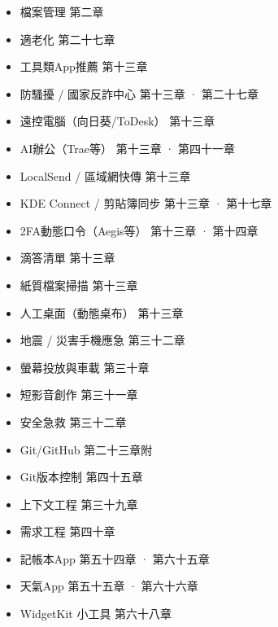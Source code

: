 
\begin{itemize}
  \item 檔案管理 第二章
  \item 適老化 第二十七章
  \item 工具類App推薦 第十三章
  \item 防騷擾 / 國家反詐中心 第十三章 · 第二十七章
  \item 遠控電腦（向日葵/ToDesk） 第十三章
  \item AI辦公（Trae等） 第十三章 · 第四十一章
  \item LocalSend / 區域網快傳 第十三章
  \item KDE Connect / 剪貼簿同步 第十三章 · 第十七章
  \item 2FA動態口令（Aegis等） 第十三章 · 第十四章
  \item 滴答清單 第十三章
  \item 紙質檔案掃描 第十三章
  \item 人工桌面（動態桌布） 第十三章
  \item 地震 / 災害手機應急 第三十二章
  \item 螢幕投放與車載 第三十章
  \item 短影音創作 第三十一章
  \item 安全急救 第三十二章
  \item Git/GitHub 第二十三章附
  \item Git版本控制 第四十五章
  \item 上下文工程 第三十九章
  \item 需求工程 第四十章
  \item 記帳本App 第五十四章 · 第六十五章
  \item 天氣App 第五十五章 · 第六十六章
  \item WidgetKit 小工具 第六十八章
\end{itemize}
